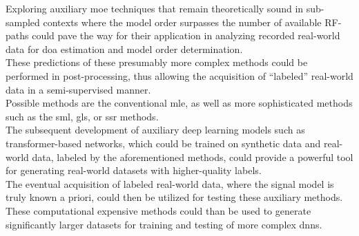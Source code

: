 Exploring auxiliary \gls{moe} techniques that remain theoretically sound in sub-sampled contexts where the model order
surpasses the number of available RF-paths could pave the way for their application in analyzing recorded real-world data for
\gls{doa} estimation and model order determination. \\
These predictions of these presumably more complex methods could be performed in post-processing, thus allowing the acquisition
of ``labeled'' real-world data in a semi-supervised manner. \\
Possible methods are the conventional \gls{mle}, as well as more sophisticated methods such as the \gls{sml}, \gls{gls}, or
\gls{ssr} methods. \\
The subsequent development of auxiliary deep learning models such as transformer-based networks, which could be trained on synthetic data
and real-world data, labeled by the aforementioned methods, could provide a powerful tool for generating real-world datasets
with higher-quality labels. \\
The eventual acquisition of labeled real-world data, where the signal model is truly known a priori, could then be utilized
for testing these auxiliary methods. \\
These computational expensive methods could than be used to generate significantly larger datasets for training and testing
of more complex \glspl{dnn}.